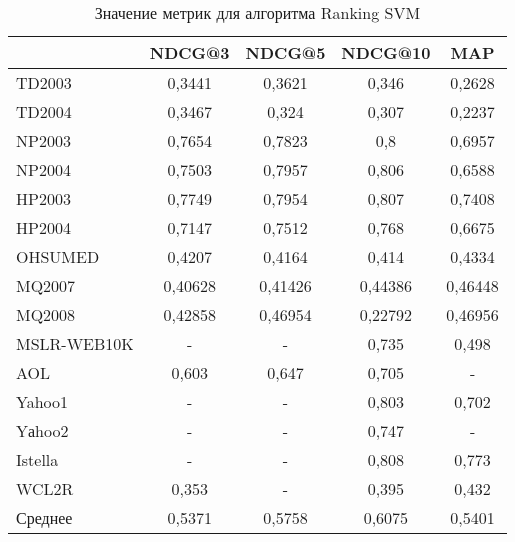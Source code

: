 \begin{table}[!ht]
	\begin{center}
		\begin{threeparttable}
			\captionsetup{justification=raggedright,singlelinecheck=off}
			\caption{Значение метрик для алгоритма Ranking SVM}
			\label{tbl:RSVMM}
			\begin{tabular}{|l|c|c|c|c|}
				\hline
				\makecell[c]{Датасет}  & NDCG@3 & NDCG@5 & NDCG@10 & MAP \\\hline
				TD2003&	0,3441&	0,3621&	0,346&	0,2628\\\hline
				TD2004&	0,3467&	0,324&	0,307&	0,2237\\\hline
				NP2003&	0,7654&	0,7823&	0,8&	0,6957\\\hline
				NP2004&	0,7503&	0,7957&	0,806&	0,6588\\\hline
				HP2003&	0,7749&	0,7954&	0,807&	0,7408\\\hline
				HP2004&	0,7147&	0,7512&	0,768&	0,6675\\\hline
				OHSUMED&	0,4207&	0,4164&	0,414&	0,4334\\\hline
				MQ2007&	0,40628&	0,41426&	0,44386&	0,46448\\\hline
				MQ2008&	0,42858&	0,46954&	0,22792&	0,46956\\\hline
				MSLR-WEB10K&	-&	-&	0,735&	0,498\\\hline
				AOL&	0,603&	0,647&	0,705&	-\\\hline
				Yahoo1&	-&	-&	0,803&	0,702\\\hline
				Yаhoo2&	-&	-&	0,747&	-\\\hline
				Istella&	-&	-&	0,808&	0,773\\\hline
				WCL2R&	0,353&	-&	0,395&	0,432\\\hline
				Среднее& 0,5371&	0,5758&	0,6075&	0,5401\\\hline
			\end{tabular}
		\end{threeparttable}
	\end{center}
\end{table}

\clearpage

